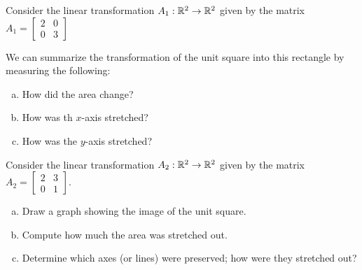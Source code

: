 
\begin{applicationActivities}{1}{25}

\begin{observation}
Consider the linear transformation $A_1 : \mathbb{R}^2 \rightarrow \mathbb{R}^2$ given by the matrix $A_1 = \begin{bmatrix} 2 & 0 \\ 0 & 3 \end{bmatrix}$

\begin{center}
\end{center}

We can summarize the transformation of the unit square into this rectangle by measuring the following:

\begin{enumerate}[(a)]
\item How did the area change?
\item How was th $x$-axis stretched?
\item How was the $y$-axis stretched?
\end{enumerate}

\end{observation}


\begin{activity}{10}
Consider the linear transformation  $A_2: \mathbb{R}^2 \rightarrow \mathbb{R}^2$ given by the matrix
$A_2 = \begin{bmatrix} 2 & 3 \\ 0 & 1 \end{bmatrix}$.

\begin{enumerate}[(a)]
\item Draw a graph showing the image of the unit square.
\item Compute how much the area was stretched out.
\item Determine which axes (or lines) were preserved; how were they stretched out?
\end{enumerate}
\end{activity}


\end{applicationActivities}
